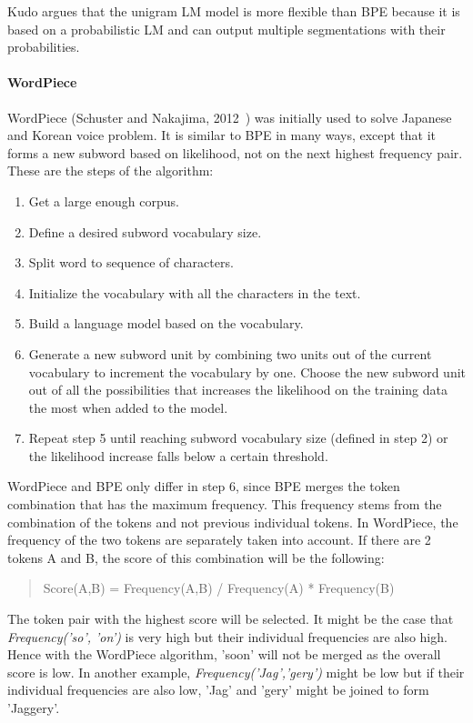 Kudo argues that the unigram LM model is more flexible than BPE because it is based on a probabilistic LM and can output multiple segmentations with their probabilities.

\paragraph{WordPiece}\label{subsubsec:wordpiece}

WordPiece (Schuster and Nakajima, 2012~\cite{schuster2012japanese}) was initially used to solve Japanese and Korean voice problem. It is similar to BPE in many ways, except that it forms a new subword based on likelihood, not on the next highest frequency pair. These are the steps of the algorithm:

\begin{enumerate}
    \item Get a large enough corpus.
    \item Define a desired subword vocabulary size.
    \item Split word to sequence of characters.
    \item Initialize the vocabulary with all the characters in the text.
    \item Build a language model based on the vocabulary.
    \item Generate a new subword unit by combining two units out of the current vocabulary to increment the vocabulary by one. Choose the new subword unit out of all the possibilities that increases the likelihood on the training data the most when added to the model.
    \item Repeat step 5 until reaching subword vocabulary size (defined in step 2) or the likelihood increase falls below a certain threshold.
\end{enumerate}

WordPiece and BPE only differ in step 6, since BPE merges the token combination that has the maximum frequency. This frequency stems from the combination of the tokens and not previous individual tokens. In WordPiece, the frequency of the two tokens are separately taken into account. If there are 2 tokens A and B, the score of this combination will be the following:

\begin{quote}
    Score(A,B) = Frequency(A,B) / Frequency(A) * Frequency(B)
\end{quote}

The token pair with the highest score will be selected. It might be the case that \textit{Frequency('so', 'on')} is very high but their individual frequencies are also high. Hence with the WordPiece algorithm, 'soon' will not be merged as the overall score is low. In another example, \textit{Frequency('Jag','gery')} might be low but if their individual frequencies are also low, 'Jag' and 'gery' might be joined to form 'Jaggery'.

